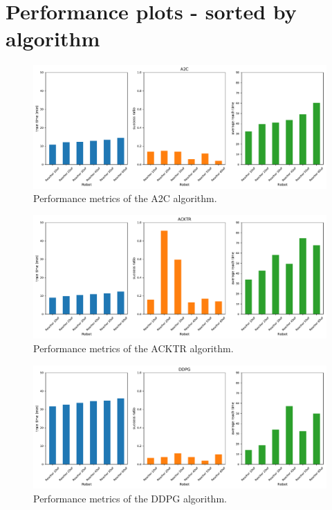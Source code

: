 \documentclass{article}
\begin{document}
\section{Performance plots - sorted by algorithm}


\begin{figure}[H]
    \centering
    \includegraphics[width=\textwidth]{../A2C.pdf}
\caption{Performance metrics of the A2C algorithm.}
\end{figure}

\begin{figure}[H]
    \centering
    \includegraphics[width=\textwidth]{../ACKTR.pdf}
\caption{Performance metrics of the ACKTR algorithm.}
\end{figure}

\begin{figure}[H]
    \centering
    \includegraphics[width=\textwidth]{../DDPG.pdf}
\caption{Performance metrics of the DDPG algorithm.}
\end{figure}
\end{document}
